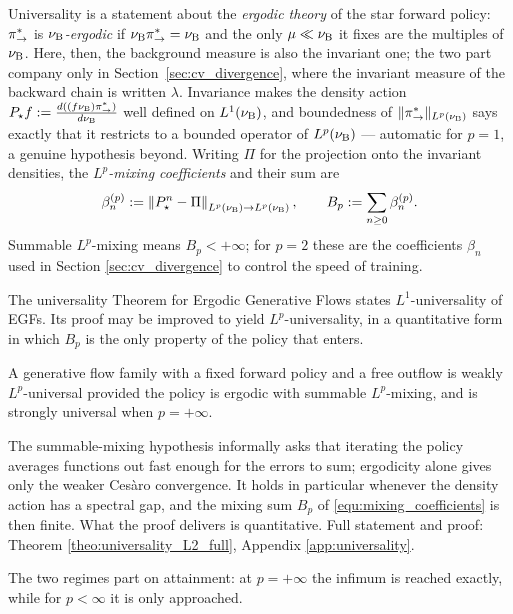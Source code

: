 Universality is a statement about the \emph{ergodic theory} of the star forward policy:
$\pi_{\rightarrow}^*$ is \emph{$\nu_{\mathrm{B}}$-ergodic} if $\nu_{\mathrm{B}}\pi_{\rightarrow}^*=\nu_{\mathrm{B}}$ and the
only $\mu\ll\nu_{\mathrm{B}}$ it fixes are the multiples of $\nu_{\mathrm{B}}$. Here, then, the background measure is also the invariant one; the two part company only in Section~\ref{sec:cv_divergence}, where the invariant measure of the backward chain is written $\lambda$. Invariance makes the density
action $P_\star f := \frac{d((f\nu_{\mathrm{B}})\pi_{\rightarrow}^*)}{d\nu_{\mathrm{B}}}$ well defined on
$L^1(\nu_{\mathrm{B}})$, and boundedness of $\|\pi_{\rightarrow}^*\|_{L^p(\nu_{\mathrm{B}})}$ says exactly that
it restricts to a bounded operator of $L^p(\nu_{\mathrm{B}})$ --- automatic for $p=1$, a genuine
hypothesis beyond. Writing $\Pi$ for the projection onto the invariant densities, the
\emph{$L^p$-mixing coefficients} and their sum are
\begin{equation}\label{equ:mixing_coefficients}
    \beta^{(p)}_n := \left\|P_\star^n - \Pi\right\|_{L^p(\nu_{\mathrm{B}})\rightarrow L^p(\nu_{\mathrm{B}})},\qquad B_p := \sum_{n\geq 0}\beta^{(p)}_n .
\end{equation}
Summable $L^p$-mixing means $B_p<+\infty$; for $p=2$ these are the coefficients $\beta_n$ used in Section \ref{sec:cv_divergence} to control the speed of training.

The universality Theorem for Ergodic Generative Flows \cite{brunswicEGF} states $L^1$-universality of EGFs. Its proof may be improved to yield $L^p$-universality, in a quantitative form in which $B_p$ is the only property of the policy that enters.
\begin{theorem}\label{theo:universality_L2}
A generative flow family with a fixed forward policy and a free outflow is weakly
$L^p$-universal provided the policy is ergodic with summable $L^p$-mixing, and is strongly
universal when $p=+\infty$.
\end{theorem}
The summable-mixing hypothesis informally asks that iterating the policy averages functions
out fast enough for the errors to sum; ergodicity alone gives only the weaker Ces\`aro
convergence. It holds in particular whenever the density action has a spectral gap, and the
mixing sum $B_p$ of \eqref{equ:mixing_coefficients} is then finite. What the proof delivers is quantitative. Full
statement and proof: Theorem \ref{theo:universality_L2_full}, Appendix
\ref{app:universality}.

The two regimes part on attainment: at $p=+\infty$ the infimum is reached exactly, while for
$p<\infty$ it is only approached.

